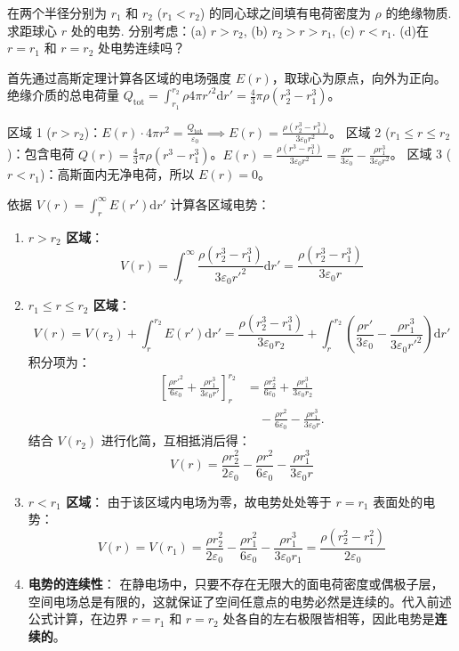 \begin{exercise}\label{ex:15.16}
在两个半径分别为 $r_1$ 和 $r_2$ ($r_1 < r_2$) 的同心球之间填有电荷密度为 $\rho$ 的绝缘物质. 求距球心 $r$ 处的电势. 分别考虑：(a) $r > r_2$, (b) $r_2 > r > r_1$, (c) $r < r_1$. (d)在 $r = r_1$ 和 $r = r_2$ 处电势连续吗？
\end{exercise}
\begin{solution}
首先通过高斯定理计算各区域的电场强度 $E(r)$，取球心为原点，向外为正向。绝缘介质的总电荷量 $Q_{\text{tot}} = \int_{r_1}^{r_2} \rho 4\pi r'^2 \mathrm{d}r' = \frac{4}{3}\pi\rho(r_2^3 - r_1^3)$。

区域 1 ($r > r_2$)：$E(r) \cdot 4\pi r^2 = \frac{Q_{\text{tot}}}{\varepsilon_0} \implies E(r) = \frac{\rho(r_2^3 - r_1^3)}{3\varepsilon_0 r^2}$。
区域 2 ($r_1 \le r \le r_2$)：包含电荷 $Q(r) = \frac{4}{3}\pi\rho(r^3 - r_1^3)$。$E(r) = \frac{\rho(r^3 - r_1^3)}{3\varepsilon_0 r^2} = \frac{\rho r}{3\varepsilon_0} - \frac{\rho r_1^3}{3\varepsilon_0 r^2}$。
区域 3 ($r < r_1$)：高斯面内无净电荷，所以 $E(r) = 0$。

依据 $V(r) = \int_r^\infty E(r') \mathrm{d}r'$ 计算各区域电势：

\begin{enumerate}
  \item[(a)] \textbf{$r > r_2$ 区域}：
  $$ V(r) = \int_r^\infty \frac{\rho(r_2^3 - r_1^3)}{3\varepsilon_0 r'^2} \mathrm{d}r' = \frac{\rho(r_2^3 - r_1^3)}{3\varepsilon_0 r} $$

  \item[(b)] \textbf{$r_1 \le r \le r_2$ 区域}：
  $$ V(r) = V(r_2) + \int_r^{r_2} E(r') \mathrm{d}r' = \frac{\rho(r_2^3 - r_1^3)}{3\varepsilon_0 r_2} + \int_r^{r_2} \left( \frac{\rho r'}{3\varepsilon_0} - \frac{\rho r_1^3}{3\varepsilon_0 r'^2} \right) \mathrm{d}r' $$
  积分项为：
  \[
\begin{aligned}
\left[\frac{\rho r'^2}{6\varepsilon_0}
+\frac{\rho r_1^3}{3\varepsilon_0 r'}\right]_r^{r_2}
&=\frac{\rho r_2^2}{6\varepsilon_0}
 +\frac{\rho r_1^3}{3\varepsilon_0 r_2}\\
&\quad-\frac{\rho r^2}{6\varepsilon_0}
 -\frac{\rho r_1^3}{3\varepsilon_0 r}.
\end{aligned}
\]
  结合 $V(r_2)$ 进行化简，互相抵消后得：
  $$ V(r) = \frac{\rho r_2^2}{2\varepsilon_0} - \frac{\rho r^2}{6\varepsilon_0} - \frac{\rho r_1^3}{3\varepsilon_0 r} $$

  \item[(c)] \textbf{$r < r_1$ 区域}：
  由于该区域内电场为零，故电势处处等于 $r = r_1$ 表面处的电势：
  $$ V(r) = V(r_1) = \frac{\rho r_2^2}{2\varepsilon_0} - \frac{\rho r_1^2}{6\varepsilon_0} - \frac{\rho r_1^3}{3\varepsilon_0 r_1} = \frac{\rho (r_2^2 - r_1^2)}{2\varepsilon_0} $$

  \item[(d)] \textbf{电势的连续性}：
  在静电场中，只要不存在无限大的面电荷密度或偶极子层，空间电场总是有限的，这就保证了空间任意点的电势必然是连续的。代入前述公式计算，在边界 $r = r_1$ 和 $r = r_2$ 处各自的左右极限皆相等，因此电势是\textbf{连续的}。
\end{enumerate}
\end{solution}

